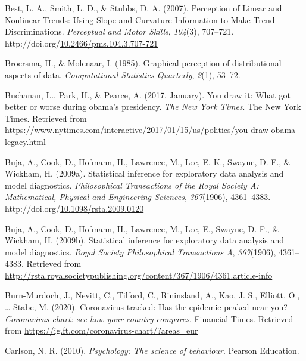 \documentclass[print]{nuthesis}
\newlength{\cslhangindent}
\newenvironment{CSLReferences}%
{\setlength{\parindent}{0pt}%
\everypar{\setlength{\hangindent}{\cslhangindent}}\ignorespaces}%
{\par}
\begin{document}
\begin{CSLReferences}{1}{0}
\leavevmode{}%
Best, L. A., Smith, L. D., \& Stubbs, D. A. (2007). Perception of {Linear} and {Nonlinear} {Trends}: {Using} {Slope} and {Curvature} {Information} to {Make} {Trend} {Discriminations}. \emph{Perceptual and Motor Skills}, \emph{104}(3), 707--721. http://doi.org/\href{https://doi.org/10.2466/pms.104.3.707-721}{10.2466/pms.104.3.707-721}

\leavevmode{}%
Broersma, H., \& Molenaar, I. (1985). Graphical perception of distributional aspects of data. \emph{Computational Statistics Quarterly}, \emph{2}(1), 53--72.

\leavevmode{}%
Buchanan, L., Park, H., \& Pearce, A. (2017, January). You draw it: What got better or worse during obama's presidency. \emph{The New York Times}. The New York Times. Retrieved from \url{https://www.nytimes.com/interactive/2017/01/15/us/politics/you-draw-obama-legacy.html}

\leavevmode{}%
Buja, A., Cook, D., Hofmann, H., Lawrence, M., Lee, E.-K., Swayne, D. F., \& Wickham, H. (2009a). Statistical inference for exploratory data analysis and model diagnostics. \emph{Philosophical Transactions of the Royal Society A: Mathematical, Physical and Engineering Sciences}, \emph{367}(1906), 4361--4383. http://doi.org/\href{https://doi.org/10.1098/rsta.2009.0120}{10.1098/rsta.2009.0120}

\leavevmode{}%
Buja, A., Cook, D., Hofmann, H., Lawrence, M., Lee, E., Swayne, D. F., \& Wickham, H. (2009b). Statistical inference for exploratory data analysis and model diagnostics. \emph{Royal Society Philosophical Transactions A}, \emph{367}(1906), 4361--4383. Retrieved from \url{http://rsta.royalsocietypublishing.org/content/367/1906/4361.article-info}

\leavevmode{}%
Burn-Murdoch, J., Nevitt, C., Tilford, C., Rininsland, A., Kao, J. S., Elliott, O., \ldots{} Stabe, M. (2020). Coronavirus tracked: Has the epidemic peaked near you? \emph{Coronavirus chart: see how your country compares}. Financial Times. Retrieved from \url{https://ig.ft.com/coronavirus-chart/?areas=eur}

\leavevmode{}%
Carlson, N. R. (2010). \emph{Psychology: The science of behaviour}. Pearson Education.


\end{CSLReferences}
\end{document}

